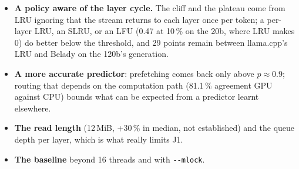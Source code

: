 \begin{itemize}
\item \textbf{A policy aware of the layer cycle.} The cliff and the plateau come from LRU ignoring that the stream returns to each layer once per token; a per-layer LRU, an SLRU, or an LFU (0.47 at 10\,\% on the 20b, where LRU makes 0) do better below the threshold, and 29 points remain between llama.cpp's LRU and Belady on the 120b's generation.
\item \textbf{A more accurate predictor}: prefetching comes back only above $p \approx 0.9$; routing that depends on the computation path (81.1\,\% agreement GPU against CPU) bounds what can be expected from a predictor learnt elsewhere.
\item \textbf{The read length} (12\,MiB, +30\,\% in median, not established) and the queue depth per layer, which is what really limits J1.
\item \textbf{The baseline} beyond 16 threads and with \texttt{-{}-mlock}.
\end{itemize}

